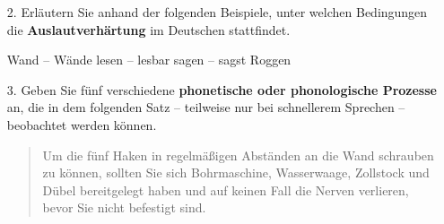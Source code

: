 {\begin{frame}

\begin{itemize}
	\item[2.]{Erläutern Sie anhand der folgenden Beispiele, unter welchen Bedingungen die \textbf{Auslautverhärtung} im Deutschen stattfindet.}

	\begin{exe}
		\begin{xlist}
		\settowidth{}
			\ex Wand -- Wände 
			\ex lesen -- lesbar 
			\ex sagen -- sagst 
			\ex Roggen 
		\end{xlist}
	\end{exe}

\end{itemize}

\end{frame}

\begin{frame}

\begin{itemize}
\item[3.]{Geben Sie fünf verschiedene \textbf{phonetische oder phonologische Prozesse} an, die in dem folgenden Satz -- teilweise nur bei schnellerem Sprechen -- beobachtet werden können.} 

\begin{exe}
	\exr{ex:HA3}
	\begin{quote}
	Um die fünf Haken in regelmäßigen Abständen an die Wand schrauben zu können, sollten Sie sich Bohrmaschine, Wasserwaage, Zollstock und Dübel bereitgelegt haben und auf keinen Fall die Nerven verlieren, bevor Sie nicht befestigt sind.
	\end{quote}
\end{exe}


	\begin{description}
		\item[] ~
	
		\end{description}


\end{itemize}
\end{frame}}
